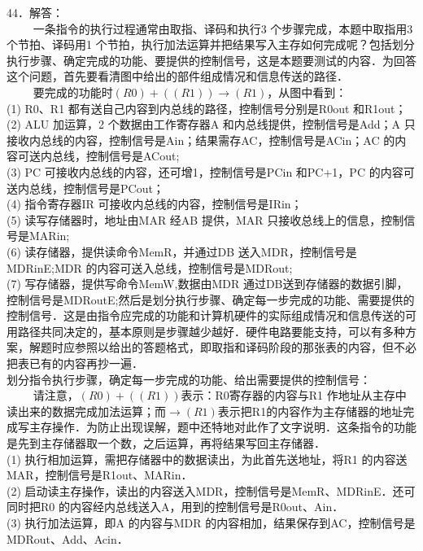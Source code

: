 44．解答： \\
$\qquad$ 一条指令的执行过程通常由取指、译码和执行3 个步骤完成，本题中取指用3 个节拍、译码用1 个节拍，执行加法运算并把结果写入主存如何完成呢？包括划分执行步骤、确定完成的功能、要提供的控制信号，这是本题要测试的内容．为回答这个问题，首先要看清图中给出的部件组成情况和信息传送的路径． \\
$\qquad$ 要完成的功能时$(R0)+((R1)) \rightarrow (R1)$，从图中看到： \\
(1) R0、R1 都有送自己内容到内总线的路径，控制信号分别是R0out 和R1out； \\
(2) ALU 加运算，2 个数据由工作寄存器A 和内总线提供，控制信号是Add；A 只接收内总线的内容，控制信号是Ain；结果需存AC，控制信号是ACin；AC 的内容可送内总线，控制信号是ACout; \\
(3) PC 可接收内总线的内容，还可增1，控制信号是PCin 和PC+1，PC 的内容可送内总线，控制信号是PCout； \\
(4) 指令寄存器IR 可接收内总线的内容，控制信号是IRin； \\
(5) 读写存储器时，地址由MAR 经AB 提供，MAR 只接收总线上的信息，控制信号是MARin; \\
(6) 读存储器，提供读命令MemR，并通过DB 送入MDR，控制信号是MDRinE;MDR 的内容可送入总线，控制信号是MDRout; \\
(7) 写存储器，提供写命令MemW,数据由MDR 通过DB送到存储器的数据引脚，控制信号是MDRoutE;然后是划分执行步骤、确定每一步完成的功能、需要提供的控制信号．这是由指令应完成的功能和计算机硬件的实际组成情况和信息传送的可用路径共同决定的，基本原则是步骤越少越好．硬件电路要能支持，可以有多种方案，解题时应参照以给出的答题格式，即取指和译码阶段的那张表的内容，但不必把表已有的内容再抄一遍． \\
划分指令执行步骤，确定每一步完成的功能、给出需要提供的控制信号： \\
$\qquad$ 请注意，$(R0)+((R1))$表示：R0寄存器的内容与R1 作地址从主存中读出来的数据完成加法运算；而$\rightarrow(R1)$表示把R1的内容作为主存储器的地址完成写主存操作．为防止出现误解，题中还特地对此作了文字说明．这条指令的功能是先到主存储器取一个数，之后运算，再将结果写回主存储器． \\
(1) 执行相加运算，需把存储器中的数据读出，为此首先送地址，将R1 的内容送MAR，控制信号是R1out、MARin． \\
(2) 启动读主存操作，读出的内容送入MDR，控制信号是MemR、MDRinE．还可同时把R0 的内容经内总线送入A，用到的控制信号是R0out、Ain． \\
(3) 执行加法运算，即A 的内容与MDR 的内容相加，结果保存到AC，控制信号是MDRout、Add、Acin． \\
